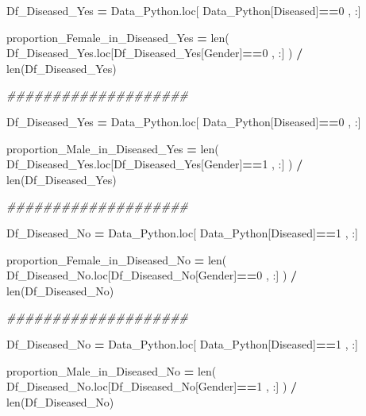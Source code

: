 \documentclass[
  11pt,
  a4paper,
]{article}
\newenvironment{Shaded}{\begin{snugshade}}{\end{snugshade}}
\newcommand{\BuiltInTok}[1]{#1}
\newcommand{\CommentTok}[1]{\textcolor[rgb]{0.56,0.35,0.01}{\textit{#1}}}
\newcommand{\DecValTok}[1]{\textcolor[rgb]{0.00,0.00,0.81}{#1}}
\newcommand{\NormalTok}[1]{#1}
\newcommand{\OperatorTok}[1]{\textcolor[rgb]{0.81,0.36,0.00}{\textbf{#1}}}
\newcommand{\StringTok}[1]{\textcolor[rgb]{0.31,0.60,0.02}{#1}}
\begin{document}
\begin{Shaded}
\begin{Highlighting}[]
\NormalTok{Df\_Diseased\_Yes }\OperatorTok{=}\NormalTok{ Data\_Python.loc[ Data\_Python[}\StringTok{\textquotesingle{}Diseased\textquotesingle{}}\NormalTok{]}\OperatorTok{==}\DecValTok{0}\NormalTok{ , :] }

\NormalTok{proportion\_Female\_in\_Diseased\_Yes }\OperatorTok{=} \BuiltInTok{len}\NormalTok{( Df\_Diseased\_Yes.loc[Df\_Diseased\_Yes[}\StringTok{\textquotesingle{}Gender\textquotesingle{}}\NormalTok{]}\OperatorTok{==}\DecValTok{0}\NormalTok{ , :] ) }\OperatorTok{/} \BuiltInTok{len}\NormalTok{(Df\_Diseased\_Yes)}

\CommentTok{\#\#\#\#\#\#\#\#\#\#\#\#\#\#\#\#\#\#\#\#}

\NormalTok{Df\_Diseased\_Yes }\OperatorTok{=}\NormalTok{ Data\_Python.loc[ Data\_Python[}\StringTok{\textquotesingle{}Diseased\textquotesingle{}}\NormalTok{]}\OperatorTok{==}\DecValTok{0}\NormalTok{ , :] }

\NormalTok{proportion\_Male\_in\_Diseased\_Yes }\OperatorTok{=} \BuiltInTok{len}\NormalTok{( Df\_Diseased\_Yes.loc[Df\_Diseased\_Yes[}\StringTok{\textquotesingle{}Gender\textquotesingle{}}\NormalTok{]}\OperatorTok{==}\DecValTok{1}\NormalTok{ , :] ) }\OperatorTok{/} \BuiltInTok{len}\NormalTok{(Df\_Diseased\_Yes)}

\CommentTok{\#\#\#\#\#\#\#\#\#\#\#\#\#\#\#\#\#\#\#\#}

\NormalTok{Df\_Diseased\_No }\OperatorTok{=}\NormalTok{ Data\_Python.loc[ Data\_Python[}\StringTok{\textquotesingle{}Diseased\textquotesingle{}}\NormalTok{]}\OperatorTok{==}\DecValTok{1}\NormalTok{ , :] }

\NormalTok{proportion\_Female\_in\_Diseased\_No }\OperatorTok{=} \BuiltInTok{len}\NormalTok{( Df\_Diseased\_No.loc[Df\_Diseased\_No[}\StringTok{\textquotesingle{}Gender\textquotesingle{}}\NormalTok{]}\OperatorTok{==}\DecValTok{0}\NormalTok{ , :] ) }\OperatorTok{/} \BuiltInTok{len}\NormalTok{(Df\_Diseased\_No)}

\CommentTok{\#\#\#\#\#\#\#\#\#\#\#\#\#\#\#\#\#\#\#\#}

\NormalTok{Df\_Diseased\_No }\OperatorTok{=}\NormalTok{ Data\_Python.loc[ Data\_Python[}\StringTok{\textquotesingle{}Diseased\textquotesingle{}}\NormalTok{]}\OperatorTok{==}\DecValTok{1}\NormalTok{ , :] }

\NormalTok{proportion\_Male\_in\_Diseased\_No }\OperatorTok{=} \BuiltInTok{len}\NormalTok{( Df\_Diseased\_No.loc[Df\_Diseased\_No[}\StringTok{\textquotesingle{}Gender\textquotesingle{}}\NormalTok{]}\OperatorTok{==}\DecValTok{1}\NormalTok{ , :] ) }\OperatorTok{/} \BuiltInTok{len}\NormalTok{(Df\_Diseased\_No)}
\end{Highlighting}
\end{Shaded}
\end{document}
